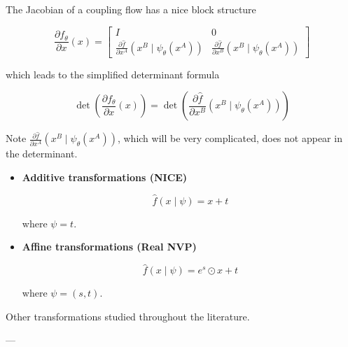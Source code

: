 \begin{concept}
    The Jacobian of a coupling flow has a nice block structure

    $$
    \frac{\partial f_{\theta}}{\partial x}(x)=\left[\begin{array}{cc}
    I & 0 \\
    \frac{\partial \hat{f}}{\partial x^{A}}\left(x^{B} \mid \psi_{\theta}\left(x^{A}\right)\right) & \frac{\partial \hat{f}}{\partial x^{B}}\left(x^{B} \mid \psi_{\theta}\left(x^{A}\right)\right)
    \end{array}\right]
    $$

    which leads to the simplified determinant formula

    $$
    \operatorname{det}\left(\frac{\partial f_{\theta}}{\partial x}(x)\right)=\operatorname{det}\left(\frac{\partial \hat{f}}{\partial x^{B}}\left(x^{B} \mid \psi_{\theta}\left(x^{A}\right)\right)\right)
    $$

    Note $\frac{\partial \hat{f}}{\partial x^{A}}\left(x^{B} \mid \psi_{\theta}\left(x^{A}\right)\right)$, which will be very complicated, does not appear in the determinant.
\end{concept}

\begin{definition}
    \begin{itemize}
        \item
        \textbf{Additive transformations (NICE)}

        $$
        \hat{f}(x \mid \psi)=x+t
        $$

        where $\psi=t$.
        \item
        \textbf{Affine transformations (Real NVP)}

        $$
        \hat{f}(x \mid \psi)=e^{s} \odot x+t
        $$

        where $\psi=(s, t)$.
    \end{itemize}

    Other transformations studied throughout the literature.
\end{definition}

--- 

